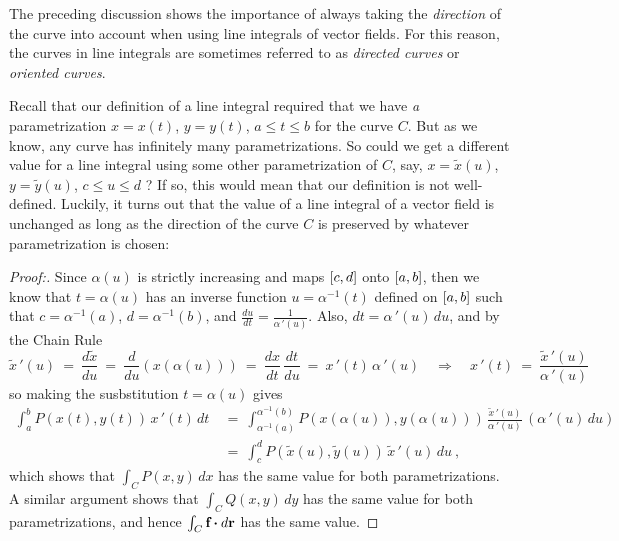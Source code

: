 The preceding discussion shows the importance of always taking the \emph{direction} of the curve into account when
using line integrals of vector fields. For this reason, the curves in line integrals are sometimes referred to as
\emph{directed curves} or \emph{oriented curves}.

Recall that our definition of a line integral required that we have
\emph{a} parametrization $x=x(t)$, $y=y(t)$, $a \le t \le b$ for the curve $C$. But as we know, any curve has
infinitely many parametrizations. So could we get a different value for a
line integral using some other parametrization of $C$, say, $x=\tilde{x}(u)$, $y=\tilde{y}(u)$, $c \le u \le d$ ? If so,
this would mean that our definition is not well-defined. Luckily, it turns out that the value of a line
integral of a vector field is unchanged as long as the direction of the curve $C$ is preserved by whatever
parametrization is chosen:

\begin{proofbar}\vspace{-3mm}\begin{proof}[Proof:]
 Since $\alpha(u)$ is strictly increasing and maps $\lbrack c,d \rbrack$ onto $\lbrack a,b \rbrack$, then we know that $t=\alpha(u)$ has
 an inverse function $u=\alpha^{-1}(t)$ defined on $\lbrack a,b \rbrack$ such that $c=\alpha^{-1}(a)$,
 $d=\alpha^{-1}(b)$, and $\frac{du}{dt} = \frac{1}{\alpha\,'(u)}$. Also, $dt = \alpha\,'(u)\,du$, and by the Chain Rule
 \begin{displaymath}
  \tilde{x}\,'(u) ~=~ \frac{d\tilde{x}}{du} ~=~ \frac{d}{du}(x(\alpha(u))) ~=~ \frac{dx}{dt}\,\frac{dt}{du} ~=~
  x\,'(t)\,\alpha\,'(u) \quad\Rightarrow\quad x\,'(t) ~=~ \frac{\tilde{x}\,'(u)}{\alpha\,'(u)}
 \end{displaymath}
 so making the susbstitution $t=\alpha(u)$ gives
 \begin{align*}
  \int_a^b P(x(t),y(t))\,x\,'(t)\,dt ~&=~
   \int_{\alpha^{-1}(a)}^{\alpha^{-1}(b)} P(x(\alpha(u)),y(\alpha(u)))\,\frac{\tilde{x}\,'(u)}{\alpha\,'(u)}
   \,(\alpha\,'(u)\,du)\\
   &=~ \int_c^d P(\tilde{x}(u),\tilde{y}(u))\,\tilde{x}\,'(u)\,du ~,
 \end{align*}
 which shows that $\int_C P(x,y)\,dx$ has the same value for both parametrizations. A similar argument shows that
 $\int_C Q(x,y)\,dy$ has the same value for both parametrizations, and hence $\int_C \textbf{f} \bm{\cdot} d\textbf{r}$
 has the same value.
 \vspace{-3mm}
\end{proof}\end{proofbar}

